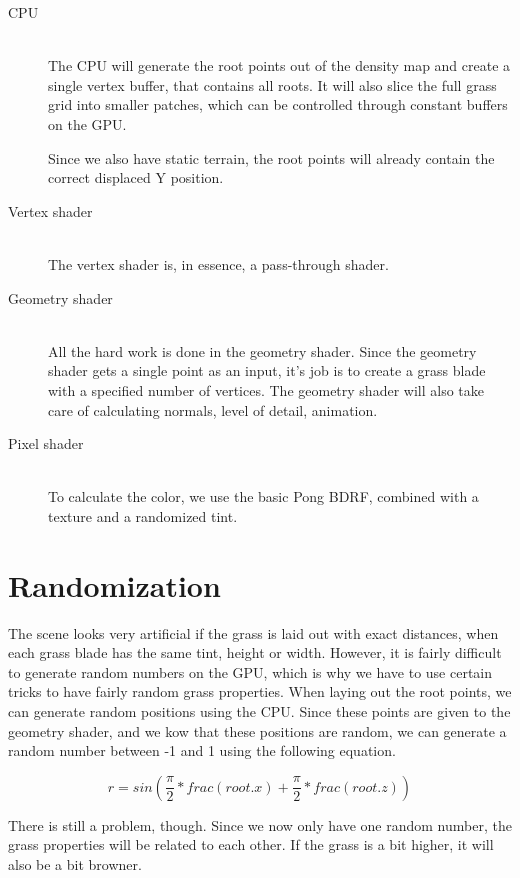 \documentclass[conference]{acmsiggraph}
\begin{document}
\begin{description}
  \item[CPU] \hfill \\
  The CPU will generate the root points out of the density map and create a single vertex buffer, that contains all roots. It will also slice the full grass grid into smaller patches, which can be controlled through constant buffers on the GPU.
  
  Since we also have static terrain, the root points will already contain the correct displaced Y position.
  \item[Vertex shader] \hfill \\
  The vertex shader is, in essence, a pass-through shader.
  \item[Geometry shader] \hfill \\
  All the hard work is done in the geometry shader. Since the geometry shader gets a single point as an input, it's job is to create a grass blade with a specified number of vertices. The geometry shader will also take care of calculating normals, level of detail, animation.
  \item[Pixel shader] \hfill \\
  To calculate the color, we use the basic Pong BDRF, combined with a texture and a randomized tint.
\end{description}

\section{Randomization}

The scene looks very artificial if the grass is laid out with exact distances, when each grass blade has the same tint, height or width. However, it is fairly difficult to generate random numbers on the GPU, which is why we have to use certain tricks to have fairly random grass properties. When laying out the root points, we can generate random positions using the CPU. Since these points are given to the geometry shader, and we kow that these positions are random, we can generate a random number between -1 and 1 using the following equation.

\begin{equation}
r = sin(\frac{\pi}2 * frac(root.x) + \frac{\pi}2 * frac(root.z))
\end{equation}

There is still a problem, though. Since we now only have one random number, the grass properties will be related to each other. If the grass is a bit higher, it will also be a bit browner.
\end{document}
